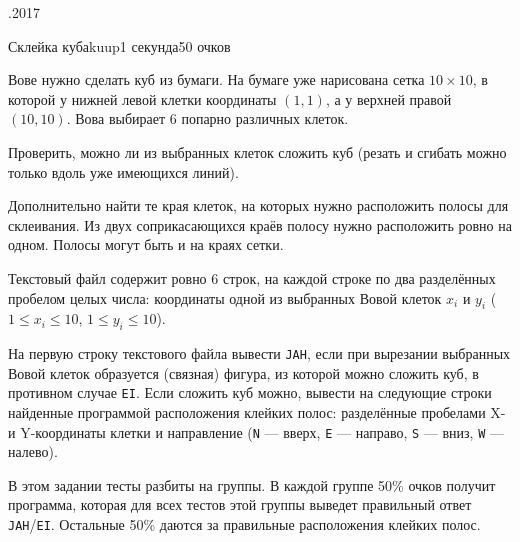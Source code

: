 \documentclass[a4paper,11pt]{article}
\begin{document}
\begin{ol}{\eio}{.2017}{\yle}{}
\begin{yl}{4}{Склейка куба}{kuup}{1 секунда}{50 очков}

Вове нужно сделать куб из бумаги. На бумаге уже нарисована сетка $10 \times 10$, в которой у нижней левой клетки координаты $(1,1)$, а у верхней правой $(10,10)$. Вова выбирает 6 попарно различных клеток.

Проверить, можно ли из выбранных клеток сложить куб (резать и сгибать можно только вдоль уже имеющихся линий).

Дополнительно найти те края клеток, на которых нужно расположить полосы для склеивания. Из двух соприкасающихся краёв полосу нужно расположить ровно на одном. Полосы могут быть и на краях сетки.

\sis Текстовый файл \sisf содержит ровно 6 строк, на каждой строке по два разделённых пробелом целых числа: координаты одной из выбранных Вовой клеток $x_i$ и $y_i$ ($1 \le x_i \le 10$, $1 \le y_i \le 10$).

\val На первую строку текстового файла \valf вывести \verb'JAH', если при вырезании выбранных Вовой клеток образуется (связная) фигура, из которой можно сложить куб, в противном случае \verb'EI'. Если сложить куб можно, вывести на следующие строки найденные программой расположения клейких полос: разделённые пробелами X- и Y-координаты клетки и направление (\verb'N' --- вверх, \verb'E' --- направо, \verb'S' --- вниз, \verb'W' --- налево).

\begin{wrapfigure}{r}{0.3\textwidth}
\vspace{-10pt}
\vspace{+10pt}
\vspace{-10pt}
\end{wrapfigure}

\nde[0]{3cm}{3cm}

\nde[1]{3cm}{3cm}

\hnd В этом задании тесты разбиты на группы. В каждой группе 50\% очков получит программа, которая для всех тестов этой группы выведет правильный ответ \verb'JAH'/\verb'EI'. Остальные 50\% даются за правильные расположения клейких полос.

\end{yl}
\end{ol}
\end{document}
